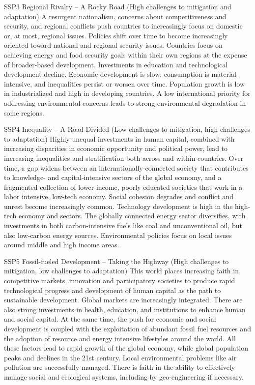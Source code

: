 \documentclass[
]{book}
\begin{document}
SSP3 Regional Rivalry -- A Rocky Road (High challenges to mitigation and adaptation)
A resurgent nationalism, concerns about competitiveness and security, and regional conflicts push countries to increasingly focus on domestic or, at most, regional issues. Policies shift over time to become increasingly oriented toward national and regional security issues. Countries focus on achieving energy and food security goals within their own regions at the expense of broader-based development. Investments in education and technological development decline. Economic development is slow, consumption is material-intensive, and inequalities persist or worsen over time. Population growth is low in industrialized and high in developing countries. A low international priority for addressing environmental concerns leads to strong environmental degradation in some regions.

SSP4 Inequality -- A Road Divided (Low challenges to mitigation, high challenges to adaptation)
Highly unequal investments in human capital, combined with increasing disparities in economic opportunity and political power, lead to increasing inequalities and stratification both across and within countries. Over time, a gap widens between an internationally-connected society that contributes to knowledge- and capital-intensive sectors of the global economy, and a fragmented collection of lower-income, poorly educated societies that work in a labor intensive, low-tech economy. Social cohesion degrades and conflict and unrest become increasingly common. Technology development is high in the high-tech economy and sectors. The globally connected energy sector diversifies, with investments in both carbon-intensive fuels like coal and unconventional oil, but also low-carbon energy sources. Environmental policies focus on local issues around middle and high income areas.

SSP5 Fossil-fueled Development -- Taking the Highway (High challenges to mitigation, low challenges to adaptation)
This world places increasing faith in competitive markets, innovation and participatory societies to produce rapid technological progress and development of human capital as the path to sustainable development. Global markets are increasingly integrated. There are also strong investments in health, education, and institutions to enhance human and social capital. At the same time, the push for economic and social development is coupled with the exploitation of abundant fossil fuel resources and the adoption of resource and energy intensive lifestyles around the world. All these factors lead to rapid growth of the global economy, while global population peaks and declines in the 21st century. Local environmental problems like air pollution are successfully managed. There is faith in the ability to effectively manage social and ecological systems, including by geo-engineering if necessary.
\end{document}
